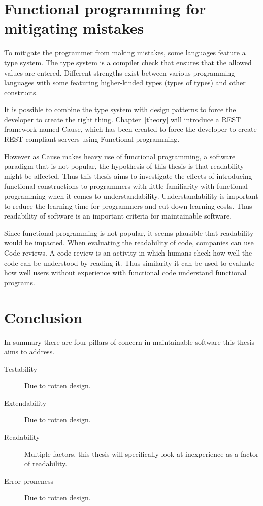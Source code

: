\section{Functional programming for mitigating mistakes}

To mitigate the programmer from making mistakes, some languages feature a type
system. The type system is a compiler check that ensures that the allowed values
are entered. Different strengths exist between various programming languages
with some featuring higher-kinded types (types of types) and other constructs.

It is possible to combine the type system with design patterns to force the
developer to create the right thing. Chapter~\ref{theory} will introduce a REST
framework named Cause, which has been created to force the developer to create
REST compliant servers using Functional programming.

However as Cause makes heavy use of functional programming,  a software
paradigm that is not popular, the hypothesis of this thesis is that readability
might be affected. Thus this thesis aims to investigate the effects of
introducing functional constructions to programmers with little familiarity
with functional programming when it comes to understandability.
Understandability is important to reduce the learning time for programmers and
cut down learning costs. Thus readability of software is an important criteria for 
maintainable software.

Since functional programming is not popular, it seems plausible that
readability would be impacted. When evaluating the readability of code,
companies can use Code reviews. A code review is an activity in which humans
check how well the code can be understood by reading it. Thus similarity it can
be used to evaluate how well users without experience with functional code
understand functional programs. 

\section{Conclusion}

In summary there are four pillars of concern in maintainable software this
thesis aims to address.

\begin{description}
    \item[Testability] Due to rotten design.
    \item[Extendability] Due to rotten design.
    \item[Readability] Multiple factors, this thesis will specifically look at 
		inexperience as a factor of readability.
    \item[Error-proneness] Due to rotten design.
\end{description}

